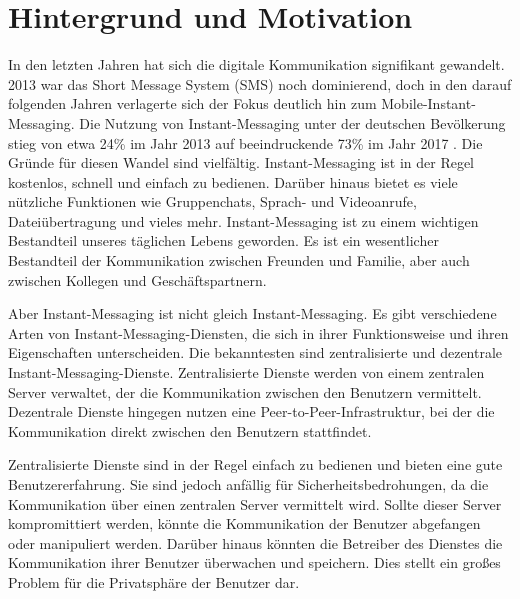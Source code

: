 \chapter{Hintergrund und Motivation}
\label{chap:einleitung}


In den letzten Jahren hat sich die digitale Kommunikation signifikant gewandelt. 2013 war das Short Message System (SMS) noch dominierend, doch in den darauf folgenden Jahren verlagerte sich der Fokus deutlich hin zum Mobile-Instant-Messaging. Die Nutzung von Instant-Messaging unter der deutschen Bevölkerung stieg von etwa 24\% im Jahr 2013 auf beeindruckende 73\% im Jahr 2017 \parencite{Hedda_digiKommunikationVeraendert}. Die Gründe für diesen Wandel sind vielfältig. Instant-Messaging ist in der Regel kostenlos, schnell und einfach zu bedienen. Darüber hinaus bietet es viele nützliche Funktionen wie Gruppenchats, Sprach- und Videoanrufe, Dateiübertragung und vieles mehr. Instant-Messaging ist zu einem wichtigen Bestandteil unseres täglichen Lebens geworden. Es ist ein wesentlicher Bestandteil der Kommunikation zwischen Freunden und Familie, aber auch zwischen Kollegen und Geschäftspartnern. 

Aber Instant-Messaging ist nicht gleich Instant-Messaging. Es gibt verschiedene Arten von Instant-Messaging-Diensten, die sich in ihrer Funktionsweise und ihren Eigenschaften unterscheiden. Die bekanntesten sind zentralisierte und dezentrale Instant-Messaging-Dienste. Zentralisierte Dienste werden von einem zentralen Server verwaltet, der die Kommunikation zwischen den Benutzern vermittelt. Dezentrale Dienste hingegen nutzen eine Peer-to-Peer-Infrastruktur, bei der die Kommunikation direkt zwischen den Benutzern stattfindet. 

Zentralisierte Dienste sind in der Regel einfach zu bedienen und bieten eine gute Benutzererfahrung. Sie sind jedoch anfällig für Sicherheitsbedrohungen, da die Kommunikation über einen zentralen Server vermittelt wird. Sollte dieser Server kompromittiert werden, könnte die Kommunikation der Benutzer abgefangen oder manipuliert werden. Darüber hinaus könnten die Betreiber des Dienstes die Kommunikation ihrer Benutzer überwachen und speichern. Dies stellt ein großes Problem für die Privatsphäre der Benutzer dar.

